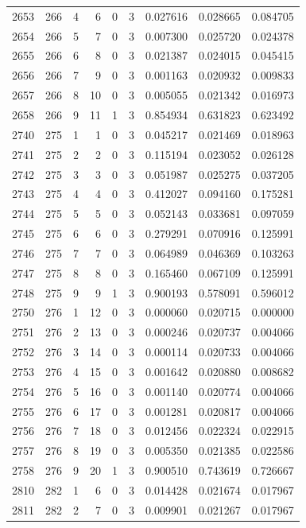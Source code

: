 \begin{longtable}{rrrrrrrrr}
2653 & 266 & 4 & 6 & 0 & 3 & 0.027616 & 0.028665 & 0.084705 \\
2654 & 266 & 5 & 7 & 0 & 3 & 0.007300 & 0.025720 & 0.024378 \\
2655 & 266 & 6 & 8 & 0 & 3 & 0.021387 & 0.024015 & 0.045415 \\
2656 & 266 & 7 & 9 & 0 & 3 & 0.001163 & 0.020932 & 0.009833 \\
2657 & 266 & 8 & 10 & 0 & 3 & 0.005055 & 0.021342 & 0.016973 \\
2658 & 266 & 9 & 11 & 1 & 3 & 0.854934 & 0.631823 & 0.623492 \\
2740 & 275 & 1 & 1 & 0 & 3 & 0.045217 & 0.021469 & 0.018963 \\
2741 & 275 & 2 & 2 & 0 & 3 & 0.115194 & 0.023052 & 0.026128 \\
2742 & 275 & 3 & 3 & 0 & 3 & 0.051987 & 0.025275 & 0.037205 \\
2743 & 275 & 4 & 4 & 0 & 3 & 0.412027 & 0.094160 & 0.175281 \\
2744 & 275 & 5 & 5 & 0 & 3 & 0.052143 & 0.033681 & 0.097059 \\
2745 & 275 & 6 & 6 & 0 & 3 & 0.279291 & 0.070916 & 0.125991 \\
2746 & 275 & 7 & 7 & 0 & 3 & 0.064989 & 0.046369 & 0.103263 \\
2747 & 275 & 8 & 8 & 0 & 3 & 0.165460 & 0.067109 & 0.125991 \\
2748 & 275 & 9 & 9 & 1 & 3 & 0.900193 & 0.578091 & 0.596012 \\
2750 & 276 & 1 & 12 & 0 & 3 & 0.000060 & 0.020715 & 0.000000 \\
2751 & 276 & 2 & 13 & 0 & 3 & 0.000246 & 0.020737 & 0.004066 \\
2752 & 276 & 3 & 14 & 0 & 3 & 0.000114 & 0.020733 & 0.004066 \\
2753 & 276 & 4 & 15 & 0 & 3 & 0.001642 & 0.020880 & 0.008682 \\
2754 & 276 & 5 & 16 & 0 & 3 & 0.001140 & 0.020774 & 0.004066 \\
2755 & 276 & 6 & 17 & 0 & 3 & 0.001281 & 0.020817 & 0.004066 \\
2756 & 276 & 7 & 18 & 0 & 3 & 0.012456 & 0.022324 & 0.022915 \\
2757 & 276 & 8 & 19 & 0 & 3 & 0.005350 & 0.021385 & 0.022586 \\
2758 & 276 & 9 & 20 & 1 & 3 & 0.900510 & 0.743619 & 0.726667 \\
2810 & 282 & 1 & 6 & 0 & 3 & 0.014428 & 0.021674 & 0.017967 \\
2811 & 282 & 2 & 7 & 0 & 3 & 0.009901 & 0.021267 & 0.017967 \\

\end{longtable}
